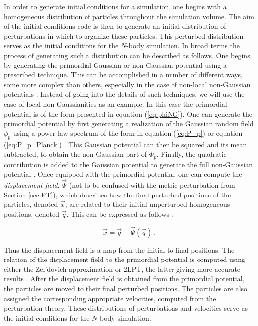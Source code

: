 \documentclass[10pt,letterpaper,final]{iopart}
\numberwithin{equation}{subsection}
\def\ni{\noindent}
\begin{document}
In order to generate initial conditions for a simulation, one begins with a homogeneous distribution of particles throughout the simulation volume. The aim of the initial conditions code is then to generate an initial distribution of perturbations in which to organize these particles. This perturbed distribution serves as the initial conditions for the $N$-body simulation. In broad terms the process of generating such a distribution can be described as follows. One begins by generating the primordial Gaussian or non-Gaussian potential using a prescribed technique. This can be accomplished in a number of different ways, some more complex than others, especially in the case of non-local non-Gaussian potentials \cite{Dalal}\cite{2lpt}\cite{Transients2}\cite{Wagner}\cite{Shandera}. Instead of going into the details of such techniques, we will use the case of local non-Gaussianities as an example. In this case the primordial potential is of the form presented in equation (\ref{eq:phiNG}). One can generate the primordial potential by first generating a realization of the Gaussian random field $\phi_p$ using a power law spectrum of the form in equation (\ref{eq:P_p}) or equation (\ref{eq:P_p_Planck}) \cite{Dalal}\cite{Shandera}. This Gaussian potential can then be squared and its mean subtracted, to obtain the non-Gaussian part of $\Phi_p$. Finally, the quadratic contribution is added to the Gaussian potential to generate the full non-Gaussian potential \cite{Dalal}\cite{Shandera}.
Once equipped with the primordial potential, one can compute the \emph{displacement field}, $\vec{\Psi}$ (not to be confused with the metric perturbation from Section \ref{sec:PT}), which describes how the final perturbed positions of the particles, denoted $\vec{x}$, are related to their initial unperturbed homogeneous positions, denoted $\vec{q}$. This can be expressed as follows \cite{Bernardeau}\cite{Transients2}:

\begin{equation}
\vec{x} = \vec{q} + \vec{\Psi}(\vec{q}) \ .
\end{equation}

\ni Thus the displacement field is a map from the initial to final positions. The relation of the displacement field to the primordial potential is computed using either the Zel'dovich approximation or 2LPT, the latter giving more accurate results \cite{Bernardeau}\cite{Transients2}. After the displacement field is obtained from the primordial potential, the particles are moved to their final perturbed positions. The particles are also assigned the corresponding appropriate velocities, computed from the perturbation theory. These distributions of perturbations and velocities serve as the initial conditions for the $N$-body simulation.
\end{document}
